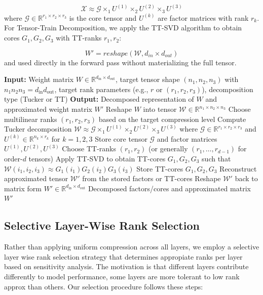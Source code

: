 \documentclass[conference]{IEEEtran}
\begin{document}
\[
    \mathcal{X}
    \approx
    \mathcal{G}
    \times_1 U^{(1)}
    \times_2 U^{(2)}
    \times_3 U^{(3)}
\]
where $\mathcal{G} \in \mathbb{R}^{r_1 \times r_2 \times r_3}$ is the core tensor and $U^{(k)}$ are factor matrices with rank $r_k$.
For Tensor-Train Decomposition, we apply the TT-SVD algorithm to obtain cores $G_1, G_2, G_3$ with TT-ranks $r_1, r_2$:

\[
W' = reshape(\mathcal{W}, d_{in} \times d_{out})
\]
and used directly in the forward pass without materializing the full tensor.

\begin{algorithm}[htbp]
\caption{Tensor Decomposition of a Single Transformer Layer}
\label{alg:tensor-decomposition}
\begin{algorithmic}[1]
\STATE \textbf{Input:} Weight matrix $W \in \mathbb{R}^{d_{\text{in}} \times d_{\text{out}}}$,
target tensor shape $(n_1, n_2, n_3)$ with $n_1 n_2 n_3 = d_{\text{in}} d_{\text{out}}$,
target rank parameters (e.g., $r$ or $(r_1, r_2, r_3)$),
decomposition type (Tucker or TT)
\STATE \textbf{Output:} Decomposed representation of $W$ and approximated weight matrix $W'$
\STATE
\STATE Reshape $W$ into tensor $\mathcal{W} \in \mathbb{R}^{n_1 \times n_2 \times n_3}$
    \STATE Choose multilinear ranks $(r_1, r_2, r_3)$ based on the target compression level
    \STATE Compute Tucker decomposition
    \STATE \quad $\mathcal{W} \approx \mathcal{G} \times_1 U^{(1)} \times_2 U^{(2)} \times_3 U^{(3)}$
    \STATE \quad where $\mathcal{G} \in \mathbb{R}^{r_1 \times r_2 \times r_3}$ and
    $U^{(k)} \in \mathbb{R}^{n_k \times r_k}$ for $k = 1,2,3$
    \STATE Store core tensor $\mathcal{G}$ and factor matrices $U^{(1)}, U^{(2)}, U^{(3)}$
    \STATE Choose TT-ranks $(r_1, r_2)$ (or generally $(r_1, \ldots, r_{d-1})$ for order-$d$ tensors)
    \STATE Apply TT-SVD to obtain TT-cores $G_1, G_2, G_3$ such that
    \STATE \quad $\mathcal{W}(i_1, i_2, i_3) \approx G_1(i_1) G_2(i_2) G_3(i_3)$
    \STATE Store TT-cores $G_1, G_2, G_3$
\ENDIF
\STATE Reconstruct approximated tensor $\mathcal{W}'$ from the stored factors or TT-cores
\STATE Reshape $\mathcal{W}'$ back to matrix form $W' \in \mathbb{R}^{d_{\text{in}} \times d_{\text{out}}}$
\RETURN Decomposed factors/cores and approximated matrix $W'$
\end{algorithmic}
\end{algorithm}

\subsection{Selective Layer-Wise Rank Selection}
Rather than applying uniform compression across all layers, we employ a selective layer wise rank selection strategy that determines
appropiate ranks per layer based on sensitivity analysis. The motivation is that different layers contribute differently to model
performance, some layers are more tolerant to low rank approx than others. Our selection procedure follows these steps:
\end{document}
